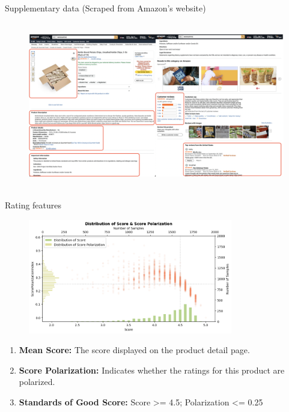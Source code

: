 \begin{frame}{Supplementary data (Scraped from Amazon's website)}
	
	\vspace{-5pt}
	\begin{figure}
		\centering
			\includegraphics[height=7.3cm]{pic/collected_amazon_data.png}
	\end{figure}

\end{frame}

\begin{frame}{Rating features}

	\begin{figure}
		\centering
			\includegraphics[height=5cm]{pic/score-scatter.png}
	\end{figure}

    \begin{enumerate}
        \item \textbf{Mean Score:} The score displayed on the product detail page.
        \item \textbf{Score Polarization:} Indicates whether the ratings for this product are polarized.
        \item \textbf{Standards of Good Score:} Score >= 4.5; Polarization <= 0.25
    \end{enumerate}

\end{frame}
	
